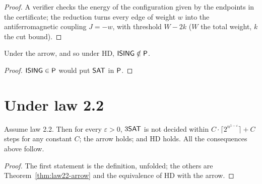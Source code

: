 \begin{proof}
  \leanok
  A verifier checks the energy of the configuration given by the endpoints in the certificate; the
  reduction turns every edge of weight $w$ into the antiferromagnetic coupling $J = -w$, with
  threshold $W - 2k$ ($W$ the total weight, $k$ the cut bound).
\end{proof}

\begin{theorem}
  \label{thm:ising-notmem-p}
  \leanok
  Under the arrow, and so under HD, $\mathsf{ISING} \notin \mathsf{P}$.
\end{theorem}

\begin{proof}
  \leanok
  $\mathsf{ISING} \in \mathsf{P}$ would put $\mathsf{SAT}$ in $\mathsf{P}$.
\end{proof}

\section{Under law 2.2}

\begin{theorem}
  \label{thm:law22-consequences}
  \leanok
  Assume law 2.2. Then for every $\varepsilon > 0$, $3\mathsf{SAT}$ is not decided within
  $C \cdot \lceil 2^{n^{1-\varepsilon}} \rceil + C$ steps for any constant $C$; the arrow holds; and
  HD holds. All the consequences above follow.
\end{theorem}

\begin{proof}
  \leanok
  The first statement is the definition, unfolded; the others are Theorem~\ref{thm:law22-arrow} and
  the equivalence of HD with the arrow.
\end{proof}
